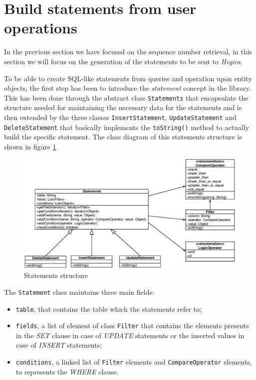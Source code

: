 \section{Build statements from user operations}
\label{sec:statements}
In the previous section we have focused on the sequence number retrieval, in this section we will focus on the generation of the statements to be sent to \textit{Hegira}.

\newparagraph To be able to create SQL-like statements from queries and operation upon entity objects, the first step has been to introduce the \textit{statement} concept in the library. This has been done through the abstract class \texttt{Statements} that encapsulate the structure needed for maintaining the necessary data for the statements and is  then extended by the three classes \texttt{InsertStatement}, \texttt{UpdateStatement} and \texttt{DeleteStatement} that basically implements the \texttt{toString()} method to actually build the specific statement.
The class diagram of this statements structure is shown in figure \ref{fig:statements}

\begin{figure}[tbh]
  \centering
  \includegraphics[width=13cm]{images/statements}
  \caption{Statements structure}
  \label{fig:statements}
\end{figure} 

\noindent The \texttt{Statement} class maintains three main fields:
\begin{itemize}
\item \texttt{table}, that contains the table which the statements refer to;
\item \texttt{fields}, a list of element of class \texttt{Filter} that contains the elements presents in the \textit{SET} clause in case of \textit{UPDATE} statements or the inserted values in case of \textit{INSERT} statements;
\item \texttt{conditions}, a linked list of \texttt{Filter} elements and \texttt{CompareOperator} elements, to represents the \textit{WHERE} clause.
\end{itemize} 

